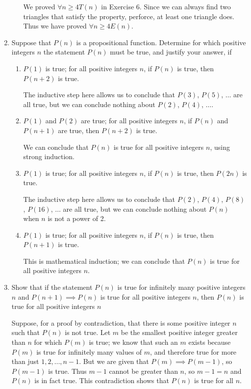 \documentclass[11pt]{article}
\begin{document}
\begin{enumerate}[label=\textbf{\arabic*.}]
\begin{enumerate}[label=\textbf{\alph*)}]
		We proved $\forall n \geq 4T(n)$ in Exercise 6. Since we can always find two triangles that satisfy the property, perforce, at least one triangle does. Thus we have proved $\forall n \geq 4E(n)$.
	\end{enumerate}

	\item Suppose that $P(n)$ is a propositional function. Determine for which positive integers $n$ the statement $P(n)$ must be true, and justify your answer, if
	
	\begin{enumerate}[label=\textbf{\alph*)}]
		\item $P(1)$ is true; for all positive integers $n$, if $P(n)$ is true, then $P(n + 2)$ is true.
		
		The inductive step here allows us to conclude that $P(3)$, $P(5)$, $\ldots$ are all true, but we can conclude nothing about $P(2)$, $P(4)$, $\ldots$.
		
		\item $P(1)$ and $P(2)$ are true; for all positive integers $n$, if $P(n)$ and $P(n + 1)$ are true, then $P(n + 2)$ is true.
		
		We can conclude that $P(n)$ is true for all positive integers $n$, using strong induction.
		
		\item $P(1)$ is true; for all positive integers $n$, if $P(n)$ is true, then $P(2n)$ is true.
		
		The inductive step here allows us to conclude that $P(2)$, $P(4)$, $P(8)$, $P(16)$, $\ldots$ are all true, but we can conclude nothing about $P(n)$ when $n$ is not a power of 2.
		
		\item $P(1)$ is true; for all positive integers $n$, if $P(n)$ is true, then $P(n + 1)$ is true.
		
		This is mathematical induction; we can conclude that $P(n)$ is true for all positive integers $n$.
	\end{enumerate}

	\item Show that if the statement $P(n)$ is true for infinitely many positive integers $n$ and $P(n + 1) \implies P(n)$ is true for all positive integers $n$, then $P(n)$ is true for all positive integers $n$
	
	Suppose, for a proof by contradiction, that there is some positive integer $n$ such that $P(n)$ is not true. Let $m$ be the smallest positive integer greater than $n$ for which $P(m)$ is true; we know that such an $m$ exists because $P(m)$ is true for infinitely many values of $m$, and therefore true for more than just $1, 2, \ldots, n - 1$. But we are given that $P(m) \implies P(m - 1)$, so $P(m - 1)$ is true. Thus $m - 1$ cannot be greater than $n$, so $m - 1 = n$ and $P(n)$ is in fact true. This contradiction shows that $P(n)$ is true for all $n$.
\end{enumerate}
\end{document}
